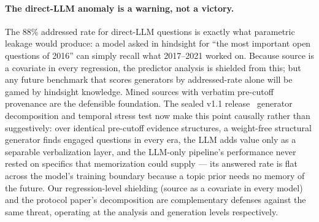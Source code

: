 \documentclass[11pt]{article}
\begin{document}
\paragraph{The direct-LLM anomaly is a warning, not a victory.} The 88\%
addressed rate for direct-LLM questions is exactly what parametric
leakage would produce: a model asked in hindsight for ``the most
important open questions of 2016'' can simply recall what 2017--2021
worked on. Because source is a covariate in every regression, the
predictor analysis is shielded from this; but any future benchmark that
scores generators by addressed-rate alone will be gamed by hindsight
knowledge. Mined sources with verbatim pre-cutoff provenance are the
defensible foundation. The sealed v1.1 release~\cite{paper2} generator decomposition and
temporal stress test now make this point causally rather than
suggestively: over identical pre-cutoff evidence structures, a
weight-free structural generator finds engaged questions in every era,
the LLM adds value only as a separable verbalization layer, and the
LLM-only pipeline's performance never rested on specifics that
memorization could supply --- its answered rate is flat across the
model's training boundary because a topic prior needs no memory of the
future. Our regression-level shielding (source as a covariate in every
model) and the protocol paper's decomposition are complementary defenses against
the same threat, operating at the analysis and generation levels
respectively.
\end{document}

